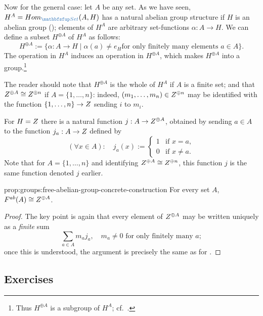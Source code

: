 Now for the general case: let $A$ be any set. As we have seen,
$H^A = \Hom_{\categ{Set}}(A,H)$ has a natural abelian group structure
if $H$ is an abelian group
(); elements of
$H^A$ are arbitrary set-functions $\alpha : A \to H$. We can define a
subset $H^{\oplus A}$ of $H^A$ as follows:
\[
  H^{\oplus A} := \{\alpha : A \to H \mid \alpha(a) \neq e_H \text{
    for only finitely many elements } a \in A\}.
\]
The operation in $H^A$ induces an operation in $H^{\oplus A}$, which
makes $H^{\oplus A}$ into a group.\footnote{Thus $H^{\oplus A}$ is a
  subgroup of $H^A$; cf.\ .}

The reader should note that $H^{\oplus A}$ is the whole of $H^A$ if
$A$ is a finite set; and that $Z^{\oplus A} \cong Z^{\oplus n}$ if
$A = \{1, \dots, n\}$: indeed, $(m_1, \dots, m_n) \in Z^{\oplus n}$
may be identified with the function $\{1, \dots, n\} \to Z$ sending
$i$ to $m_i$.

For $H = Z$ there is a natural function $j : A \to Z^{\oplus A}$,
obtained by sending $a \in A$ to the function $j_a : A \to Z$ defined
by
\[
  (\forall x \in A) : \quad j_a(x) :=
  \begin{cases} 1 & \text{if } x = a, \\ 0 & \text{if } x \neq
    a. \end{cases}
\]
Note that for $A = \{1, \dots, n\}$ and identifying
$Z^{\oplus A} \cong Z^{\oplus n}$, this function $j$ is the same
function denoted $j$ earlier.

\begin{prop}{}{prop:groups:free-abelian-group-concrete-construction}
  For every set $A$,
    $F^{ab}(A) \cong Z^{\oplus
      A}$.
\end{prop}
\begin{proof}
  The key point is again that every element of $Z^{\oplus A}$ may be
  written uniquely as a \emph{finite} sum
  \[
    \sum_{a \in A} m_a j_a, \quad m_a \neq 0 \text{ for only finitely
      many } a;
  \]
  once this is understood, the argument is precisely the same as for
  .
\end{proof}

\subsection*{Exercises}

